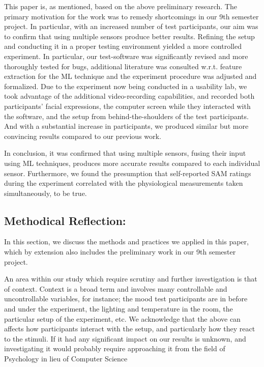 This paper is, as mentioned, based on the above preliminary research. The
primary motivation for the work was to remedy shortcomings in our 9th semester
project. In particular, with an increased number of test participants, our aim
was to confirm that using multiple sensors produce better results. Refining the
setup and conducting it in a proper testing environment yielded a more
controlled experiment. In particular, our test-software was significantly
revised and more thoroughly tested for bugs, additional literature was consulted
w.r.t. feature extraction for the ML technique and the experiment procedure was
adjusted and formalized. Due to the experiment now being conducted in a
usability lab, we took advantage of the additional video-recording capabilities,
and recorded both participants' facial expressions, the computer screen while
they interacted with the software, and the setup from behind-the-shoulders of
the test participants. And with a substantial increase in participants, we
produced similar but more convincing results compared to our previous work.

In conclusion, it was confirmed that using multiple sensors, fusing their input
using ML techniques, produces more accurate results compared to each individual
sensor. Furthermore, we found the presumption that self-reported SAM ratings
during the experiment correlated with the physiological measurements taken
simultaneously, to be true.

\subsection{Methodical Reflection:}
In this section, we discuss the methods and practices we applied in this paper,
which by extension also includes the preliminary work in our 9th semester
project.

An area within our study which require scrutiny and further investigation is
that of context. Context is a broad term and involves many controllable and
uncontrollable variables, for instance; the mood test participants are in
before and under the experiment, the lighting and temperature in the room, the
particular setup of the experiment, etc. We acknowledge that the above can
affects how participants interact with the setup, and particularly how they
react to the stimuli. If it had any significant impact on our results is
unknown, and investigating it would probably require approaching it from the
field of Psychology in lieu of Computer Science

